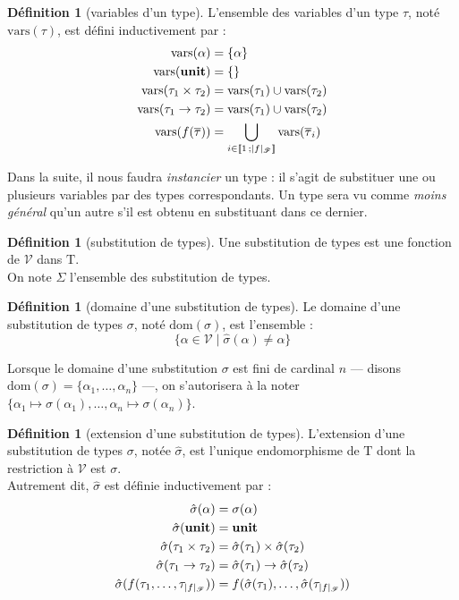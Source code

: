\documentclass[a4paper]{report}
\theoremstyle{definition}
\newtheorem{definition}[theoreme]{Définition}
\newcommand{\interval}[2]{[\![#1\,;#2]\!]}
\newcommand{\unit}{\bold{unit}}
\newcommand{\V}{\mathscr{V}}
\newcommand{\F}{\mathscr{F}}
\newcommand{\T}{\mathrm{T}}
\begin{document}
\begin{definition}[variables d'un type]
	L'ensemble des variables d'un type $\tau$, noté $\mathrm{vars} (\tau)$, est défini inductivement par :
	\begin{align*}
			\mathrm{vars} (\alpha) &=
			\{ \alpha \}
		\\
			\mathrm{vars} (\unit) &=
			\{ \}
		\\
			\mathrm{vars} (\tau_1 \times \tau_2) &=
			\mathrm{vars} (\tau_1) \cup \mathrm{vars} (\tau_2)
		\\
			\mathrm{vars} (\tau_1 \rightarrow \tau_2) &=
			\mathrm{vars} (\tau_1) \cup \mathrm{vars} (\tau_2)
		\\
			\mathrm{vars} (f (\overline\tau)) &=
			\bigcup_{i \in \interval 1 {|f|_\F}} \mathrm{vars} (\overline\tau_i)
	\end{align*}
\end{definition}

Dans la suite, il nous faudra \emph{instancier} un type : il s'agit de substituer une ou plusieurs variables par des types correspondants. Un type sera vu comme \emph{moins général} qu'un autre s'il est obtenu en substituant dans ce dernier.

\begin{definition}[substitution de types]
	Une substitution de types est une fonction de $\V$ dans $\T$. \\
	On note $\Sigma$ l'ensemble des substitution de types.
\end{definition}

\begin{definition}[domaine d'une substitution de types]
	Le domaine d'une substitution de types $\sigma$, noté $\mathrm{dom} (\sigma)$, est l'ensemble :
	\[ \{ \alpha \in \V \mid \hat\sigma (\alpha) \neq \alpha \} \]
\end{definition}

Lorsque le domaine d'une substitution $\sigma$ est fini de cardinal $n$ — disons $\mathrm{dom} (\sigma) = \{ \alpha_1, \dots, \alpha_n \}$ —, on s'autorisera à la noter $\{ \alpha_1 \mapsto \sigma (\alpha_1), \dots, \alpha_n \mapsto \sigma (\alpha_n) \}$.

\begin{definition}[extension d'une substitution de types]
	L'extension d'une substitution de types $\sigma$, notée $\hat\sigma$, est l'unique endomorphisme de $\T$ dont la restriction à $\V$ est $\sigma$. \\
	Autrement dit, $\hat\sigma$ est définie inductivement par :
	\begin{align*}
			\hat\sigma (\alpha) &=
			\sigma (\alpha)
		\\
			\hat\sigma (\unit) &=
			\unit
		\\
			\hat\sigma (\tau_1 \times \tau_2) &=
			\hat\sigma (\tau_1) \times \hat\sigma (\tau_2)
		\\
			\hat\sigma (\tau_1 \rightarrow \tau_2) &=
			\hat\sigma (\tau_1) \rightarrow \hat\sigma (\tau_2)
		\\
			\hat\sigma (f (\tau_1, \dots, \tau_{|f|_\F})) &=
			f (\hat\sigma (\tau_1), \dots, \hat\sigma (\tau_{|f|_\F}))
	\end{align*}
\end{definition}
\end{document}
